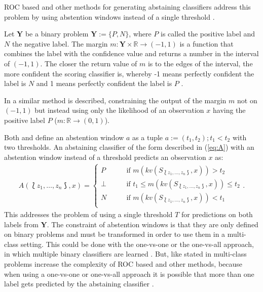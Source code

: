 \documentclass[twoside,11pt]{article}
\def\ds{\Lbag z_1,\dots,z_n \Rbag}
\def\Y{\textbf{Y}}
\begin{document}
ROC based and other methods for generating abstaining
classifiers address this problem by using abstention
windows instead of a single threshold
\citep[see][]{friedel_et_al_2006}.

Let $\Y$ be a binary problem $\Y := \{P, N\}$,
where $P$ is called the positive label and $N$ the
negative label.
The margin $m: \Y \times \mathbb{R} \rightarrow (-1,1)$ is
a function that combines the label with the confidence
value and returns a number in the interval of $(-1,1)$.
The closer the return value of $m$ is to the edges of the
interval, the more confident the scoring classifier is,
whereby -1 means perfectly confident the label is $N$ and 1
means perfectly confident the label is $P$
\citep[see][]{friedel_et_al_2006}.

In \citet{guan_et_al_2018} a similar method is described,
constraining the output of the margin $m$ not on $(-1,1)$
but instead using only the likelihood of an observation $x$
having the positive label $P$
($m: \mathbb{R} \rightarrow (0,1)$).

Both \citet{friedel_et_al_2006} and \citet{guan_et_al_2018}
define an abstention window $a$ as a tuple
$a := (t_1, t_2); t_1 < t_2$ with two thresholds.
An abstaining classifier of the form described in
(\ref{eq:A}) with an abstention window instead of a
threshold predicts an observation $x$ as:
\begin{align*}
  A(\ds, x) =
    \begin{cases}
      P    &\qquad \text{if } m(kv(S_{\ds}, x)) > t_2 \\
      \bot &\qquad \text{if }
            t_1 \leq m(kv(S_{\ds}, x)) \leq t_2 \\
      N    &\qquad \text{if } m(kv(S_{\ds}, x)) < t_1 \\
    \end{cases}.
\end{align*}
This addresses the problem of using a single threshold $T$
for predictions on both labels from $\Y$.
The constraint of abstention windows is that they are only
defined on binary problems and must be transformed in order
to use them in a multi-class setting.
This could be done with the one-vs-one or the one-vs-all
approach, in which multiple binary classifiers are learned
\citep[see e.g.][Chapter 14.5]{murphy_2012}.
But, like stated in \citet{friedel_2005} multi-class
problems increase the complexity of ROC based and other
methods, because when using a one-vs-one or one-vs-all
approach it is possible that more than one label gets
predicted by the abstaining classifier
\citep[see][]{friedel_2005}.
\end{document}
